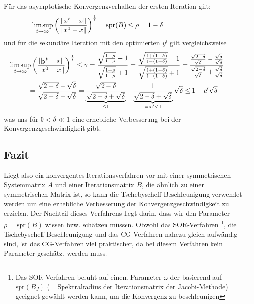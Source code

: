 \documentclass[12pt,a4paper,numbers=endperiod]{scrartcl}
\theoremstyle{definition}
\newcommand{\spr}{\text{spr}}
\begin{document}
Für das asymptotische Konvergenzverhalten der ersten Iteration gilt:
\begin{gather}
	 \limsup\limits_{t \rightarrow \infty} \bigg(\frac{||x^t-x||}{||x^0-x||}\bigg)^{\frac{1}{t}} = \spr(B) \leq \rho = 1-\delta \hspace{30mm}
\end{gather}
und für die sekundäre Iteration mit den optimierten $y^t$ gilt vergleichsweise
\begin{equation}
\begin{gathered}
	\limsup\limits_{t \rightarrow \infty} \bigg(\frac{||y^t-x||}{||x^0-x||}\bigg)^{\frac{1}{t}} \leq \gamma = \frac{\sqrt{\frac{1+\rho}{1-\rho}}-1}{\sqrt{\frac{1+\rho}{1-\rho}}+1} = \frac{\sqrt{\frac{1+(1-\delta)}{1-(1-\delta)}}-1}{\sqrt{\frac{1+(1-\delta)}{1-(1-\delta)}}+1} = \frac{\frac{\sqrt{2-\delta}}{\sqrt{\delta}} - \frac{\sqrt{\delta}}{\sqrt{\delta}}}{\frac{\sqrt{2-\delta}}{\sqrt{\delta}} + \frac{\sqrt{\delta}}{\sqrt{\delta}}} \hspace{10mm}\\
	= \frac{\sqrt{2-\delta}-\sqrt{\delta}}{\sqrt{2-\delta}+\sqrt{\delta}} = \underbrace{\frac{\sqrt{2-\delta}}{\sqrt{2-\delta}+\sqrt{\delta}}}_{\leq 1} - \underbrace{\frac{1}{\sqrt{2-\delta}+\sqrt{\delta}}}_{=:c'<1}\sqrt{\delta} \leq 1 - c'\sqrt{\delta} \hspace{3mm}
\end{gathered}
\end{equation}
was uns für $0 < \delta \ll 1$ eine erhebliche Verbesserung bei der Konvergenzgeschwindigkeit gibt.

\subsection{Fazit}
Liegt also ein konvergentes Iterationsverfahren vor mit einer symmetrischen Systemmatrix $A$ und einer Iterationsmatrix $B$, die ähnlich zu einer symmetrischen Matrix ist, so kann die Tschebyscheff-Beschleunigung verwendet werden um eine erhebliche Verbesserung der Konvergenzgeschwindigkeit zu erzielen. 
Der Nachteil dieses Verfahrens liegt darin, dass wir den Parameter $\rho = \spr(B)$ wissen bzw. schätzen müssen. Obwohl das SOR-Verfahren \footnote{Das SOR-Verfahren beruht auf einem Parameter $\omega$ der basierend auf $\spr(B_J)$ (= Spektralradius der Iterationsmatrix der Jacobi-Methode) geeignet gewählt werden kann, um die Konvergenz zu beschleunigen}, die Tschebyscheff-Beschleunigung und das CG-Verfahren nahezu gleich aufwändig sind, ist das CG-Verfahren viel praktischer, da bei diesem Verfahren kein Parameter geschätzt werden muss.




 
\end{document}
